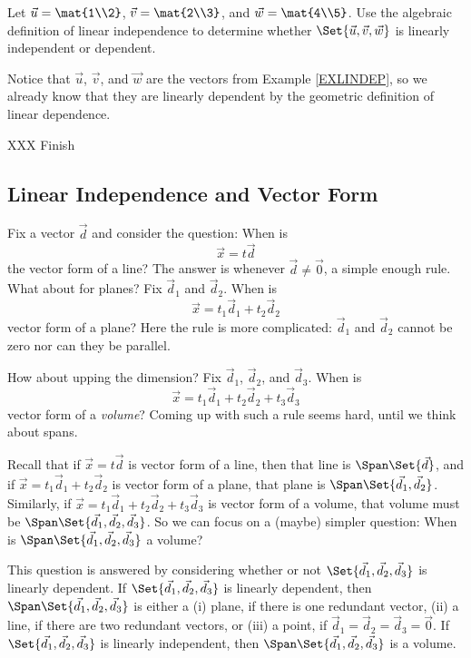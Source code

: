 \begin{example}
	Let $\vec u=\mat{1\\2}$, $\vec v=\mat{2\\3}$, and $\vec w=\mat{4\\5}$. Use the algebraic definition
	of linear independence to determine whether
	$\Set{\vec u,\vec v,\vec w}$ is linearly independent or dependent.

	Notice that $\vec u$, $\vec v$, and $\vec w$ are the vectors from Example \ref{EXLINDEP},
	so we already know that they are linearly dependent by the geometric definition of linear dependence.

	XXX Finish
\end{example}

\subsection{Linear Independence and Vector Form}

Fix a vector $\vec d$ and consider the question: When is
\[
	\vec x=t\vec d
\]
the vector form of a line? The answer is whenever $\vec d\neq \vec 0$, a simple enough rule. What about
for planes? Fix $\vec d_1$ and $\vec d_2$. When is
\[
	\vec x=t_1\vec d_1+t_2\vec d_2
\]
vector form of a plane? Here the rule is more complicated: $\vec d_1$ and $\vec d_2$ cannot be zero
nor can they be parallel. 

How about upping the dimension? Fix $\vec d_1$, $\vec d_2$, and $\vec d_3$. When is
\[
	\vec x=t_1\vec d_1+t_2\vec d_2+t_3\vec d_3
\]
vector form of a \emph{volume}? Coming up with such a rule seems hard, until we think
about spans.

Recall that if $\vec x=t\vec d$ is vector form of a line, then that line is $\Span\Set{\vec d}$,
and if $\vec x=t_1\vec d_1+t_2\vec d_2$ is vector form of a plane, that plane is $\Span\Set{\vec d_1,\vec d_2}$.
Similarly, if $\vec x=t_1\vec d_1+t_2\vec d_2+t_3\vec d_3$ is vector form of a volume,
that volume must be $\Span\Set{\vec d_1,\vec d_2,\vec d_3}$. So we can focus on a (maybe) simpler question:
When is $\Span\Set{\vec d_1,\vec d_2,\vec d_3}$ a volume?

This question is answered by considering whether or not $\Set{\vec d_1,\vec d_2,\vec d_3}$ is linearly
dependent. If $\Set{\vec d_1,\vec d_2,\vec d_3}$ is linearly dependent, then $\Span\Set{\vec d_1,\vec d_2,\vec d_3}$
is either a (i) plane, if there is one redundant vector, (ii) a line, if there are two redundant vectors, or (iii)
a point, if $\vec d_1=\vec d_2=\vec d_3=\vec 0$. If $\Set{\vec d_1,\vec d_2,\vec d_3}$ is linearly independent,
then $\Span\Set{\vec d_1,\vec d_2,\vec d_3}$ is a volume.

